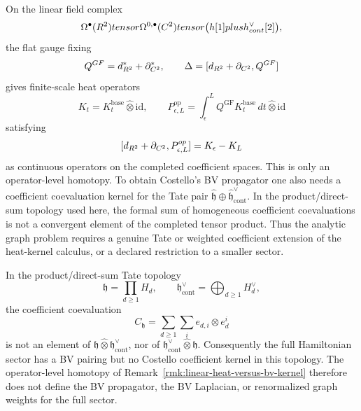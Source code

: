 \documentclass[11pt]{memoir}
\begin{document}
\begin{rmk}\label{rmk:linear-heat-versus-bv-kernel}
  On the linear field complex
  $$\Omega^\bullet(R^2)tensor
    \Omega^{0,\bullet}(C^2)tensor
    \bigl(h[1]plus
      h^{\vee}_{cont}[2]\bigr),$$
  the flat gauge fixing
  $$Q^{GF}=d_{R^2}^*+\partial_{C^2}^*,\qquad
    \Delta=[d_{R^2}+\partial_{C^2},Q^{GF}]$$
  gives finite-scale heat operators
  $$K_t=K_t^{\mathrm{base}}\widehat\otimes\mathrm{id},\qquad
    P_{\epsilon,L}^{\mathrm{op}}
      =\int_\epsilon^L Q^{\mathrm{GF}}K_t^{\mathrm{base}}\,dt
        \widehat\otimes\mathrm{id}$$
  satisfying
  $$[d_{R^2}+\partial_{C^2},P_{\epsilon,L}^{op}]
    =K_\epsilon-K_L$$
  as continuous operators on the completed coefficient spaces. This is only an
  operator-level homotopy. To obtain Costello's BV propagator one also needs a
  coefficient coevaluation kernel for the Tate pair
  $\widehat{\mathfrak h}\oplus\widehat{\mathfrak h}^{\vee}_{\mathrm{cont}}$.
  In the product/direct-sum topology used here, the formal sum of homogeneous
  coefficient coevaluations is not a convergent element of the completed tensor
  product. Thus the analytic graph problem requires a genuine Tate or weighted
  coefficient extension of the heat-kernel calculus, or a declared restriction
  to a smaller sector.
\end{rmk}

\begin{lem}\label{lem:tate-casimir-obstruction}
  In the product/direct-sum Tate topology
  $$\mathfrak h=\prod_{d\geq1}H_d,\qquad
    \mathfrak h^\vee_{\mathrm{cont}}=\bigoplus_{d\geq1}H_d^\vee,$$
  the coefficient coevaluation
  $$C_{\mathfrak h}=\sum_{d\geq1}\sum_i e_{d,i}\otimes e^i_{d}$$
  is not an element of
  $\mathfrak h\widehat\otimes\mathfrak h^\vee_{\mathrm{cont}}$, nor of
  $\mathfrak h^\vee_{\mathrm{cont}}\widehat\otimes\mathfrak h$. Consequently
  the full Hamiltonian sector has a BV pairing but no Costello
  coefficient kernel in this topology. The operator-level homotopy of
  Remark~\ref{rmk:linear-heat-versus-bv-kernel} therefore does not define the
  BV propagator, the BV Laplacian, or renormalized graph weights for the full
  sector.
\end{lem}
\end{document}
